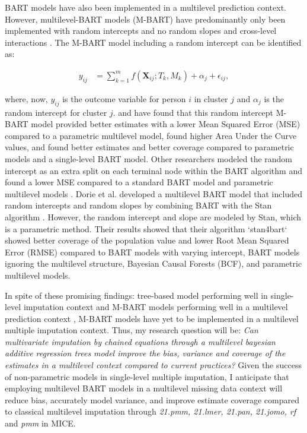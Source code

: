 \documentclass[10pt, a4paper, titlepage]{article}
\begin{document}
BART models have also been implemented in a multilevel prediction context. However, multilevel-BART models (M-BART) have predominantly only been implemented with random intercepts and no random slopes and cross-level interactions \citep{chen2020, wagner2020, tan2016, wundervald2022}. The M-BART model including a random intercept can be identified as:

\begin{subequations}
\label{eq:M-BART}
\begin{align}
y_{ij} &= \sum_{k=1}^{m} f(\textbf{X}_{ij}; T_{k}, M_{k}) + \alpha_{j} + \epsilon_{ij}, \tag{3}
\end{align}
\end{subequations}

where, now, $y_{ij}$ is the outcome variable for person $i$ in cluster $j$ and $\alpha_{j}$ is the random intercept for cluster $j$. \citet{wagner2020} and have found that this random intercept M-BART model provided better estimates with a lower Mean Squared Error (MSE) compared to a parametric multilevel model, \citet{tan2016} found higher Area Under the Curve values, and \citet{chen2020} found better estimates and better coverage compared to parametric models and a single-level BART model. Other researchers modeled the random intercept as an extra split on each terminal node within the BART algorithm and found a lower MSE compared to a standard BART model and parametric multilevel models \citep{wundervald2022}. Dorie et al. developed a multilevel BART model that included random intercepts and random slopes by combining BART with the Stan algorithm \citep{dorie2022}. However, the random intercept and slope are modeled by Stan, which is a parametric method. Their results showed that their algorithm `stan4bart` showed better coverage of the population value and lower Root Mean Squared Error (RMSE) compared to BART models with varying intercept, BART models ignoring the multilevel structure, Bayesian Causal Forests (BCF), and parametric multilevel models.

In spite of these promising findings: tree-based model performing well in single-level imputation context \citep{burgette2010, xu2016, silva2022, stekhoven2012, waljee2013} and M-BART models performing well in a multilevel prediction context \citep{chen2020, wagner2020, tan2016, wundervald2022, dorie2022}, M-BART models have yet to be implemented in a multilevel multiple imputation context. Thus, my research question will be: \textit{Can multivariate imputation by chained equations through a multilevel bayesian additive regression trees model improve the bias, variance and coverage of the estimates in a multilevel context compared to current practices?} Given the success of non-parametric models in single-level multiple imputation, I anticipate that employing multilevel BART models in a multilevel missing data context will reduce bias, accurately model variance, and improve estimate coverage compared to classical multilevel imputation through \textit{21.pmm, 21.lmer, 21.pan, 21.jomo, rf} and \textit{pmm} in MICE.
\end{document}
